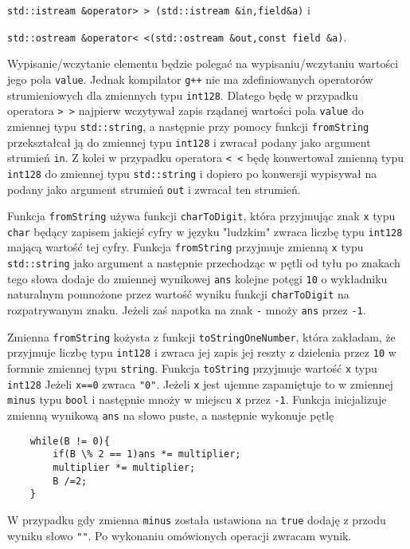 \documentclass{article}
\begin{document}
\texttt{std::istream \&operator> > (std::istream \&in,field\&a)} i

\texttt{std::ostream \&operator< <(std::ostream \&out,const field \&a)}.

Wypisanie/wczytanie elementu będzie polegać na wypisaniu/wczytaniu 
wartości jego pola \texttt{value}. Jednak kompilator \texttt{g++} nie ma zdefiniowanych operatorów strumieniowych 
dla zmiennych typu \texttt{\textunderscore \textunderscore int128}. Dlatego będę w przypadku operatora \texttt{> >} najpierw
wczytywał zapis rządanej wartości pola \texttt{value} do zmiennej typu \texttt{std::string}, a następnie przy pomocy funkcji 
\texttt{fromString} przekształcał ją do zmiennej typu \texttt{\textunderscore \textunderscore int128} i zwracał podany 
jako argument strumień \texttt{in}. Z kolei w przypadku operatora \texttt{< <} będę konwertował zmienną typu 
\texttt{\textunderscore \textunderscore int128} do zmiennej typu \texttt{std::string} i dopiero po konwersji
wypisywał na podany jako argument strumień \texttt{out} i zwracał ten strumień.

Funkcja \texttt{fromString} używa funkcji \texttt{charToDigit}, która przyjmując znak \texttt{x} typu 
\texttt{char} będący zapisem jakiejś cyfry w języku "ludzkim" zwraca liczbę typu 
\texttt{\textunderscore \textunderscore int128} mającą wartość tej cyfry. Funkcja \texttt{fromString} przyjmuje 
zmienną \texttt{x} typu \texttt{std::string} jako argument a następnie przechodząc w pętli od tyłu
po znakach tego słowa
dodaje do zmiennej wynikowej \texttt{ans} kolejne potęgi \texttt{10} o wykładniku naturalnym pomnożone przez wartość
wyniku funkcji \texttt{charToDigit} na rozpatrywanym znaku. Jeżeli zaś napotka na znak \texttt{-} mnoży \texttt{ans}
przez \texttt{-1}.

Zmienna \texttt{fromString} kożysta z funkcji \texttt{toStringOneNumber}, która zakładam, 
że przyjmuje liczbę typu \texttt{\textunderscore \textunderscore int128}
i zwraca jej zapis jej reszty z dzielenia przez \texttt{10} w formnie zmiennej typu \texttt{string}.
Funkcja \texttt{toString} 
przyjmuje wartość \texttt{x} typu \texttt{\textunderscore \textunderscore int128}
Jeżeli \texttt{x==0} zwraca \texttt{"0"}. Jeżeli \texttt{x} jest ujemne zapamiętuje to w zmiennej
\texttt{minus} typu \texttt{bool} i następnie mnoży w miejscu \texttt{x} przez \texttt{-1}. 
Funkcja inicjalizuje zmienną wynikową \texttt{ans} na słowo puste, a następnie wykonuje pętlę
\begin{lstlisting}
    while(B != 0){
        if(B \% 2 == 1)ans *= multiplier;
        multiplier *= multiplier;
        B /=2;
    }
\end{lstlisting}
W przypadku gdy zmienna \texttt{minus} została ustawiona na \texttt{true} dodaję z przodu wyniku słowo \texttt{"\textminus"}.
Po wykonaniu omówionych operacji zwracam wynik. 
\end{document}
